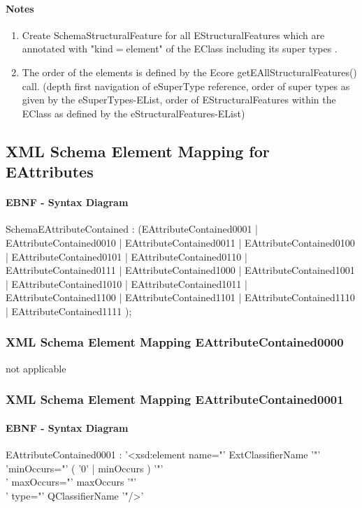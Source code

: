 \documentclass[11pt,a4paper]{article}
\begin{document}
\paragraph{Notes}
\begin{enumerate}
\item Create SchemaStructuralFeature for all EStructuralFeatures which are annotated with "kind$=$element" of the EClass including its super types .
\item The order of the elements is defined by the Ecore getEAllStructuralFeatures() call. (depth first navigation of eSuperType reference, order of super types as given by the eSuperTypes-EList, order of EStructuralFeatures within the EClass as defined by the eStructuralFeatures-EList)
\end{enumerate}

\subsection{XML Schema Element Mapping for EAttributes}
\paragraph{EBNF - Syntax Diagram}
\begin{rail}
SchemaEAttributeContained : (EAttributeContained0001 | EAttributeContained0010 | EAttributeContained0011 | EAttributeContained0100 | EAttributeContained0101 | EAttributeContained0110 | EAttributeContained0111 | EAttributeContained1000 | EAttributeContained1001 | EAttributeContained1010 | EAttributeContained1011 | EAttributeContained1100 | EAttributeContained1101 | EAttributeContained1110 | EAttributeContained1111 );
\end{rail}

\subsubsection{XML Schema Element Mapping EAttributeContained0000}
not applicable


\subsubsection{XML Schema Element Mapping EAttributeContained0001}
\paragraph{EBNF - Syntax Diagram}
\begin{rail}
EAttributeContained0001 :
'<xsd:element name="' ExtClassifierName '"'\\
    'minOccurs="' ( '0' | minOccurs ) '"'\\
    ' maxOccurs="' maxOccurs '"'\\
    ' type="' QClassifierName '"/>' 
\end{rail}
\end{document}

